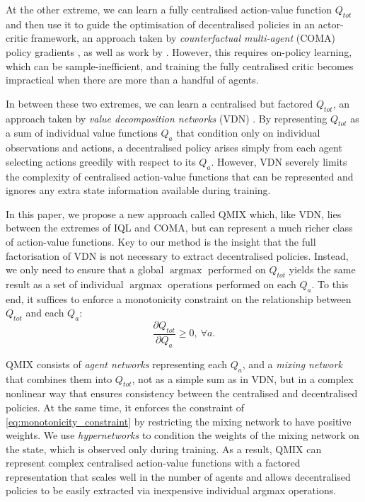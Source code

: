 \documentclass[twoside,11pt]{article}
\DeclareMathOperator*{\argmax}{argmax}
\renewcommand{\cite}{\citep}
\begin{document}
At the other extreme, we can learn a fully centralised action-value function $Q_{tot}$ and then use it to guide the optimisation of decentralised policies in an actor-critic framework, an approach taken by \emph{counterfactual multi-agent} (COMA) policy gradients \cite{foerster_counterfactual_2017}, as well as work by \citet{gupta_cooperative_2017}. However, this requires on-policy learning, which can be sample-inefficient, and training the fully centralised critic becomes impractical when there are more than a handful of agents.

In between these two extremes, we can learn a centralised but factored $Q_{tot}$, an approach taken by \emph{value decomposition networks} (VDN) \cite{sunehag_value-decomposition_2017}. By representing $Q_{tot}$ as a sum of individual value functions $Q_a$ that condition only on individual observations and actions, a decentralised policy arises simply from each agent selecting actions greedily with respect to its $Q_a$. However, VDN severely limits the complexity of centralised action-value functions that can be represented and ignores any extra state information available during training.

In this paper, we propose a new approach called QMIX which, like VDN, lies between the extremes of IQL and COMA, but can represent a much richer class of action-value functions. Key to our method is the insight that the full factorisation of VDN is not necessary to extract decentralised policies.  Instead, we only need to ensure that a global $\argmax$ performed on $Q_{tot}$ yields the same result as a set of individual $\argmax$ operations performed on each $Q_a$.  To this end, it suffices to enforce a monotonicity constraint on the relationship between $Q_{tot}$ and each $Q_a$:
\begin{equation}
\label{eq:monotonicity_constraint}
\frac{\partial Q_{tot}}{\partial Q_a}  \geq 0,~ \forall a.
\end{equation}

QMIX consists of \textit{agent networks} representing each $Q_a$, and a 
\emph{mixing network} that combines them into $Q_{tot}$, not as a simple sum as 
in VDN, but in a complex nonlinear way that ensures consistency between the 
centralised and decentralised policies.
At the same time, it enforces the 
constraint of \eqref{eq:monotonicity_constraint} by restricting the mixing 
network to have positive weights.
We use \emph{hypernetworks} \cite{ha_hypernetworks_2016} to condition the weights of the mixing network on the state, which is observed only during training.
As a result, QMIX can represent complex centralised action-value 
functions with a factored representation that scales well in the number of 
agents and allows decentralised policies to be easily extracted via inexpensive 
individual argmax operations.
\end{document}
